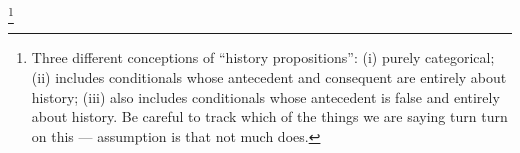\documentclass[If.tex]{subfiles}
\begin{document}
%

\footnote{Three different conceptions of “history propositions”: (i) purely categorical; (ii) includes conditionals whose antecedent and consequent are entirely about history; (iii) also includes conditionals whose antecedent is false and entirely about history.  Be careful to track which of the things we are saying turn turn on this --- assumption is that not much does.}
\end{document}
